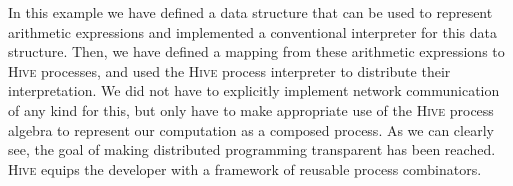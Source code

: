 In this example we have defined a data structure that can be used to represent arithmetic expressions and implemented a conventional interpreter for this data structure. Then, we have defined a mapping from these arithmetic expressions to \textsc{Hive} processes, and used the \textsc{Hive} process interpreter to distribute their interpretation. We did not have to explicitly implement network communication of any kind for this, but only have to make appropriate use of the \textsc{Hive} process algebra to represent our computation as a composed process. As we can clearly see, the goal of making distributed programming transparent has been reached. \textsc{Hive} equips the developer with a framework of reusable process combinators.